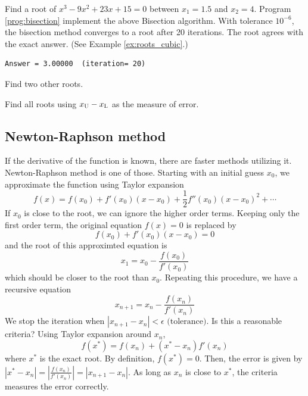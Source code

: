 \bigskip
\begin{example}\label{ex:bisection}
Find a root of $x^3 -9 x^2 + 23 x + 15=0$ between $x_1=1.5$ and $x_2=4$. 
Program \ref{prog:bisection} implement the above Bisection algorithm.  With tolerance $10^{-6}$, the bisection method converges to a root after 20 iterations. The root agrees with the exact answer. (See Example \ref{ex:roots_cubic}.)
\begin{mybox}
\small
\begin{verbatim}
Answer = 3.00000  (iteration= 20)
\end{verbatim}
\normalsize
\end{mybox}
\end{example}

\noindent
	\exercise
	Find two other roots.
	
	\bigskip\noindent
	\exercise
	Find all roots using $x_\textsc{U}-x_\textsc{L}$ as the measure of error.
	
\noindent
\subsection{Newton-Raphson method}

If the derivative of the function is known, there are faster methods utilizing it.  Newton-Raphson method is one of those. Starting with an initial guess $x_0$, we approximate the function using Taylor expansion
\begin{equation}
f(x) = f(x_0) + f'(x_0) (x-x_0) + \frac{1}{2} f''(x_0) (x-x_0)^2 + \cdots 
\end{equation}
If $x_0$ is close to the root, we can ignore the higher order terms.  Keeping only the first order term, the original equation $f(x)=0$ is replaced by
\begin{equation}
f(x_0) + f'(x_0) (x-x_0) = 0
\end{equation}
and the root of this approximted equation is 
\begin{equation}
x_1 = x_0 - \frac{f(x_0)}{f'(x_0)}
\end{equation}
which should be closer to the root than $x_0$.  Repeating this procedure, we have a recursive equation
\begin{equation}
x_{n+1} = x_n - \frac{f(x_n)}{f'(x_n)}
\label{eq:newton_raphson}
\end{equation}
We stop the iteration when $|x_{n+1}-x_n| < \epsilon \text{ (tolerance)}$.  Is this a reasonable criteria?  Using Taylor expansion around $x_n$,
\begin{equation}
f(x^*) = f(x_n) + (x^*-x_n) f'(x_n)
\end{equation}
where $x^*$ is the exact root.   By definition, $f(x^*)=0$.  Then, the error is given by $|x^*-x_n| =  \left | \displaystyle\frac{f(x_n)}{f'(x_n)} \right | = |x_{n+1}-x_n|$.  As long as $x_n$ is close to $x^*$, the criteria measures the error correctly.

